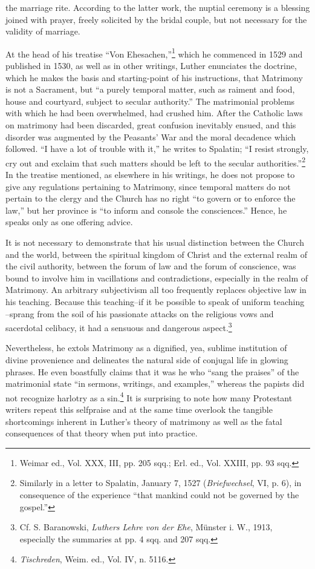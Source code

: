 the marriage rite. According to the latter work, the nuptial ceremony
is a blessing joined with prayer, freely solicited by the bridal couple,
but not necessary for the validity of marriage.

At the head of his treatise “Von Ehesachen,”\footnote{Weimar ed., Vol. XXX, III, pp. 205 sqq.; Erl. ed., Vol. XXIII, pp. 93 sqq.}
 which he commenced
in 1529 and published in 1530, as well as in other writings,
Luther enunciates the doctrine, which he makes the basis and starting-point
of his instructions, that Matrimony is not a Sacrament, but
“a purely temporal matter, such as raiment and food, house and courtyard,
subject to secular authority.” The matrimonial problems with
which he had been overwhelmed, had crushed him. After the Catholic
laws on matrimony had been discarded, great confusion inevitably
ensued, and this disorder was augmented by the Peasants’ War and the
moral decadence which followed. “I have a lot of trouble with it,”
he writes to Spalatin; “I resist strongly, cry out and exclaim that such
matters should be left to the secular authorities.”\footnote{Similarly in a letter to Spalatin, January 7, 1527 (\textit{Briefwechsel}, VI, p. 6), in consequence
of the experience “that mankind could not be governed by the gospel.”}
In the treatise
mentioned, as elsewhere in his writings, he does not propose to give
any regulations pertaining to Matrimony, since temporal matters do
not pertain to the clergy and the Church has no right “to govern or to
enforce the law,” but her province is “to inform and console the
consciences.” Hence, he speaks only as one offering advice.

It is not necessary to demonstrate that his usual distinction between
the Church and the world, between the spiritual kingdom of Christ
and the external realm of the civil authority, between the forum of law
and the forum of conscience, was bound to involve him in vacillations
and contradictions, especially in the realm of Matrimony. An arbitrary
subjectivism all too frequently replaces objective law in his teaching.
Because this teaching--if it be possible to speak of uniform teaching
--sprang from the soil of his passionate attacks on the religious vows
and sacerdotal celibacy, it had a sensuous and dangerous aspect.\footnote
{Cf. S. Baranowski, \textit{Luthers Lehre von der Ehe}, Münster i. W., 1913, especially the
summaries at pp. 4 sqq. and 207 sqq.}

Nevertheless, he extols Matrimony as a dignified, yea, sublime institution
of divine provenience and delineates the natural side of conjugal
life in glowing phrases. He even boastfully claims that it was he who
“sang the praises” of the matrimonial state “in sermons, writings, and
examples,” whereas the papists did not recognize harlotry as a sin.\footnote
{\textit{Tischreden}, Weim. ed., Vol. IV, n. 5116.}
It is surprising to note how many Protestant writers repeat this selfpraise
and at the same time overlook the tangible shortcomings inherent
in Luther’s theory of matrimony as well as the fatal consequences
of that theory when put into practice.

